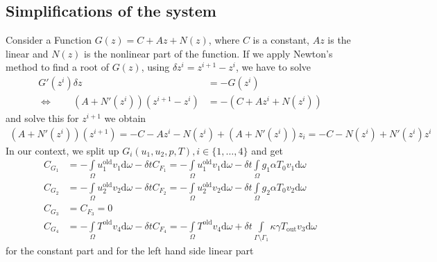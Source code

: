 \documentclass{article}
\begin{document}
\subsection{Simplifications of the system}
Consider a Function $G(z) = C + Az + N(z)$, where $C$ is a constant, $Az$ is the linear and $N(z)$ is the nonlinear part of the function. If we apply Newton's method to find a root of $G(z)$, using $\delta z^i = z^{i+1}-z^{i}$, we have to solve
\begin{align}
\label{newtoneq}
G'(z^i)\delta z &= -G(z^i) \\
\Leftrightarrow  \qquad (A+N'(z^i))(z^{i+1}-z^i) &= -\left(C + Az^i + N(z^i)\right)
\end{align}
and solve this for $z^{i+1}$ we obtain
\begin{align*}
(A+N'(z^i))(z^{i+1}) = -C - Az^i - N(z^i) +(A+N'(z^i))z_i = -C-N(z^i) + N'(z^i)z^i
\end{align*}
In our context, we split up $G_i(u_1,u_2,p,T),i\in \{1,\dots,4\}$ and get
\begin{align*}
C_{G_1} &= -\int\limits_{\Omega}u_1^\text{old}v_1\text{d}\omega-\delta tC_{F_1} =-\int\limits_{\Omega}u_1^\text{old}v_1\text{d}\omega -\delta t\int\limits_\Omega g_1\alpha T_0 v_1 \text{d}\omega \\
C_{G_2} &= -\int\limits_{\Omega}u_2^\text{old}v_2\text{d}\omega-\delta tC_{F_2} =-\int\limits_{\Omega}u_2^\text{old}v_2\text{d}\omega -\delta t\int\limits_\Omega g_2\alpha T_0 v_2 \text{d}\omega \\
C_{G_3} &= C_{F_3} = 0 \\
C_{G_4} &= -\int\limits_{\Omega}T^\text{old}v_4\text{d}\omega-\delta tC_{F_4} =-\int\limits_{\Omega}T^\text{old}v_4\text{d}\omega + \delta t\int\limits_{\Gamma\setminus\Gamma_1} \kappa\gamma T_\text{out} v_3\text{d}\omega
\end{align*}
for the constant part and for the left hand side linear part
\end{document}
